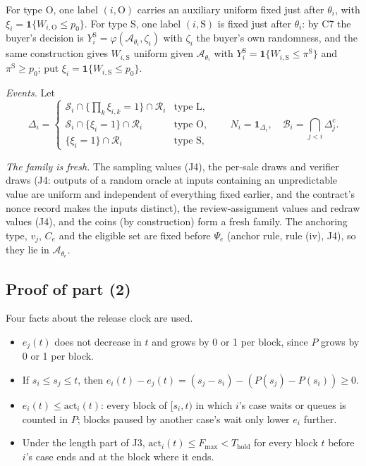 \documentclass[10pt,a4paper]{article}
\newcommand{\Thold}{T_{\mathrm{hold}}}
\newcommand{\Fmax}{F_{\max}}
\newcommand{\cA}{\mathcal{A}}
\newcommand{\cR}{\mathcal{R}}
\newcommand{\cS}{\mathcal{S}}
\newcommand{\cB}{\mathcal{B}}
\newcommand{\one}{\mathbf{1}}
\theoremstyle{plain}
\theoremstyle{remark}
\begin{document}
For type O, one label $(i,\mathrm O)$ carries an auxiliary uniform fixed just after $\theta_i$, with $\xi_i=\one\{W_{i,\mathrm O}\le p_0\}$. For type S, one label $(i,\mathrm S)$ is fixed just after $\theta_i$: by C7 the buyer's decision is $Y^{\mathrm S}_i=\varphi(\cA_{\theta_i},\zeta_i)$ with $\zeta_i$ the buyer's own randomness, and the same construction gives $W_{i,\mathrm S}$ uniform given $\cA_{\theta_i}$ with $Y^{\mathrm S}_i=\one\{W_{i,\mathrm S}\le\pi^{\mathrm S}\}$ and $\pi^{\mathrm S}\ge p_0$; put $\xi_i=\one\{W_{i,\mathrm S}\le p_0\}$.

\emph{Events.} Let
\[
\Delta_i=\begin{cases}
\cS_i\cap\{\prod_k\xi_{i,k}=1\}\cap\cR_i & \text{type L},\\
\cS_i\cap\{\xi_i=1\}\cap\cR_i & \text{type O},\\
\{\xi_i=1\}\cap\cR_i & \text{type S},
\end{cases}
\qquad N_i=\one_{\Delta_i},\quad \cB_i=\textstyle\bigcap_{j<i}\Delta_j^c .
\]

\emph{The family is fresh.} The sampling values (J4), the per-sale draws and verifier draws (J4: outputs of a random oracle at inputs containing an unpredictable value are uniform and independent of everything fixed earlier, and the contract's nonce record makes the inputs distinct), the review-assignment values and redraw values (J4), and the coins (by construction) form a fresh family. The anchoring type, $v_j$, $C_e$ and the eligible set are fixed before $\Psi_e$ (anchor rule, rule (iv), J4), so they lie in $\cA_{\theta_e}$.

\subsection{Proof of part (2)}

Four facts about the release clock are used.
\begin{itemize}
\item[F1.] $e_j(t)$ does not decrease in $t$ and grows by 0 or 1 per block, since $P$ grows by 0 or 1 per block.
\item[F2.] If $s_i\le s_j\le t$, then $e_i(t)-e_j(t)=(s_j-s_i)-(P(s_j)-P(s_i))\ge0$.
\item[F3.] $e_i(t)\le\mathrm{act}_i(t)$: every block of $[s_i,t)$ in which $i$'s case waits or queues is counted in $P$; blocks paused by another case's wait only lower $e_i$ further.
\item[F4.] Under the length part of J3, $\mathrm{act}_i(t)\le\Fmax<\Thold$ for every block $t$ before $i$'s case ends and at the block where it ends.
\end{itemize}
\end{document}
